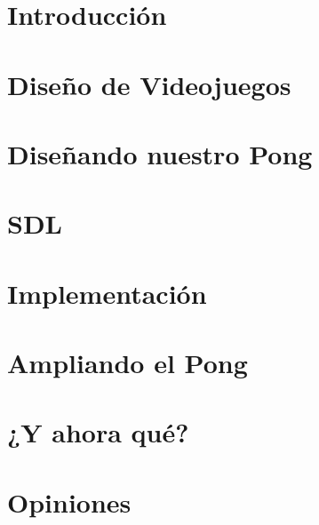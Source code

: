 \documentclass{beamer}
\begin{document}
\section{Introducción}

\section{Diseño de Videojuegos}

\section{Diseñando nuestro Pong}

\section{SDL}

\section{Implementación}

\section{Ampliando el Pong}

\section{¿Y ahora qué?}

\section{Opiniones}
\end{document}
